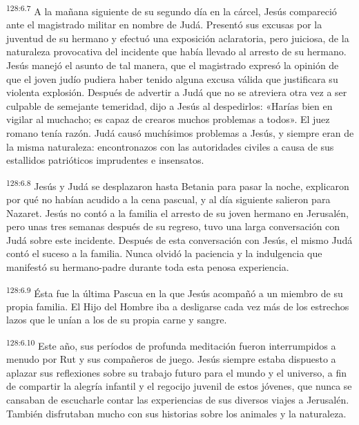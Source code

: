 \par 
\textsuperscript{128:6.7} A la mañana siguiente de su segundo día en la cárcel, Jesús compareció ante el magistrado militar en nombre de Judá. Presentó sus excusas por la juventud de su hermano y efectuó una exposición aclaratoria, pero juiciosa, de la naturaleza provocativa del incidente que había llevado al arresto de su hermano. Jesús manejó el asunto de tal manera, que el magistrado expresó la opinión de que el joven judío pudiera haber tenido alguna excusa válida que justificara su violenta explosión. Después de advertir a Judá que no se atreviera otra vez a ser culpable de semejante temeridad, dijo a Jesús al despedirlos: «Harías bien en vigilar al muchacho; es capaz de crearos muchos problemas a todos». El juez romano tenía razón. Judá causó muchísimos problemas a Jesús, y siempre eran de la misma naturaleza: encontronazos con las autoridades civiles a causa de sus estallidos patrióticos imprudentes e insensatos.

\par 
\textsuperscript{128:6.8} Jesús y Judá se desplazaron hasta Betania para pasar la noche, explicaron por qué no habían acudido a la cena pascual, y al día siguiente salieron para Nazaret. Jesús no contó a la familia el arresto de su joven hermano en Jerusalén, pero unas tres semanas después de su regreso, tuvo una larga conversación con Judá sobre este incidente. Después de esta conversación con Jesús, el mismo Judá contó el suceso a la familia. Nunca olvidó la paciencia y la indulgencia que manifestó su hermano-padre durante toda esta penosa experiencia.

\par 
\textsuperscript{128:6.9} Ésta fue la última Pascua en la que Jesús acompañó a un miembro de su propia familia. El Hijo del Hombre iba a desligarse cada vez más de los estrechos lazos que le unían a los de su propia carne y sangre.

\par 
\textsuperscript{128:6.10} Este año, sus períodos de profunda meditación fueron interrumpidos a menudo por Rut y sus compañeros de juego. Jesús siempre estaba dispuesto a aplazar sus reflexiones sobre su trabajo futuro para el mundo y el universo, a fin de compartir la alegría infantil y el regocijo juvenil de estos jóvenes, que nunca se cansaban de escucharle contar las experiencias de sus diversos viajes a Jerusalén. También disfrutaban mucho con sus historias sobre los animales y la naturaleza.

